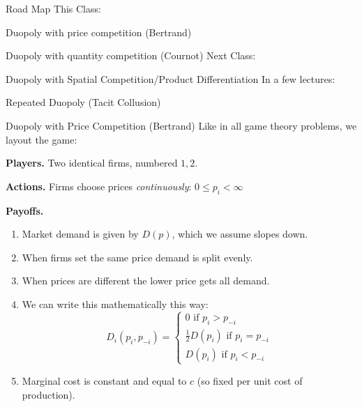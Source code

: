 \documentclass[aspectratio=169]{beamer}
\newenvironment{wideitemize}{\itemize\addtolength{\itemsep}{10pt}}{\enditemize}
\begin{document}
\begin{frame}{Road Map}
This Class:
\begin{wideitemize}
    \item Duopoly with price competition (Bertrand)
    \item Duopoly with quantity competition (Cournot)
\end{wideitemize}
Next Class:
\begin{wideitemize}
    \item Duopoly with Spatial Competition/Product Differentiation
\end{wideitemize}
In a few lectures:
\begin{wideitemize}
    \item Repeated Duopoly (Tacit Collusion)
\end{wideitemize}

    
\end{frame}
\begin{frame}{Duopoly with Price Competition (Bertrand)}
Like in all game theory problems, we layout the game:
\begin{wideitemize}
    \item \textbf{Players.} Two identical firms, numbered $1,2$.
    \item \textbf{Actions.} Firms choose prices \textit{continuously}: $0\leq p_i < \infty$
    \item \textbf{Payoffs.} 
    \begin{enumerate}
        \item Market demand is given by $D(p)$, which we assume slopes down.
        \item When firms set the same price demand is split evenly.
        \item When prices are different the lower price gets all demand.
        \item We can write this mathematically this way:
        \[D_i(p_i, p_{-i}) = \begin{cases} 0 \text{ if } p_i>p_{-i}\\
        \frac{1}{2}D(p_i) \text{ if } p_i=p_{-i}\\
        D(p_i) \text{ if } p_i<p_{-i}
        \end{cases}\]
        \item Marginal cost is constant and equal to $c$ (so fixed per unit cost of production).
    \end{enumerate}
\end{wideitemize}

    
\end{frame}
\end{document}
